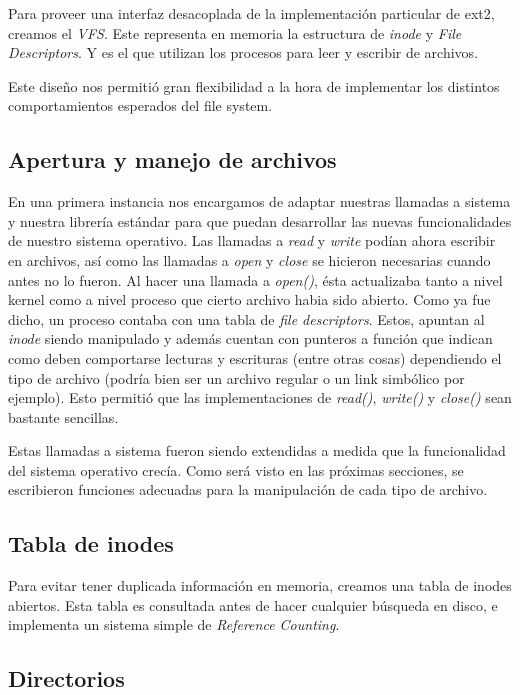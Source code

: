 \documentclass[a4paper,10pt]{article}
\begin{document}
Para proveer una interfaz desacoplada de la implementación particular de ext2, creamos el \textit{VFS}.
Este representa en memoria la estructura de \textit{inode} y \textit{File Descriptors}.
Y es el que utilizan los procesos para leer y escribir de archivos.

Este diseño nos permitió gran flexibilidad a la hora de implementar los distintos comportamientos esperados del file system.

\subsection{Apertura y manejo de archivos}
En una primera instancia nos encargamos de adaptar nuestras llamadas a sistema y nuestra librería estándar
para que puedan desarrollar las nuevas funcionalidades de nuestro sistema operativo.
Las llamadas a \textit{read} y \textit{write} podían ahora escribir en archivos, así como las llamadas a \textit{open} y \textit{close} se hicieron
necesarias cuando antes no lo fueron.
Al hacer una llamada a \textit{open()}, ésta actualizaba tanto a nivel kernel como a nivel proceso que cierto archivo habia sido abierto. 
Como ya fue dicho, un proceso contaba con una tabla de \textit{file descriptors}. 
Estos, apuntan al \textit{inode} siendo manipulado y además cuentan con punteros a función que indican como deben comportarse lecturas y escrituras (entre otras cosas) dependiendo el tipo de archivo 
(podría bien ser un archivo regular o un link simbólico por ejemplo). 
Esto permitió que las implementaciones de \textit{read()}, \textit{write()} y \textit{close()} sean bastante sencillas. 
    
Estas llamadas a sistema fueron siendo extendidas a medida que la funcionalidad del sistema operativo crecía. 
Como será visto en las próximas secciones, se escribieron funciones adecuadas para la manipulación de cada tipo de archivo.

\subsection{Tabla de inodes}
Para evitar tener duplicada información en memoria, creamos una tabla de inodes abiertos.
Esta tabla es consultada antes de hacer cualquier búsqueda en disco, e implementa un sistema simple de \textit{Reference Counting}.

\subsection{Directorios}
\end{document}
